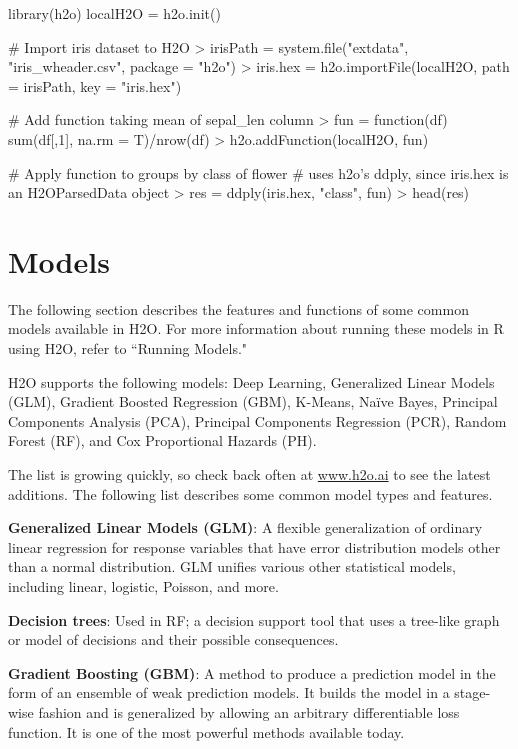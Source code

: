 \documentclass[11pt]{article}
\begin{document}
{\begin{spverbatim}
library(h2o)
localH2O = h2o.init()

# Import iris dataset to H2O
> irisPath = system.file("extdata", "iris_wheader.csv", package = "h2o")
> iris.hex = h2o.importFile(localH2O, path = irisPath, key = "iris.hex")

# Add function taking mean of sepal_len column
> fun = function(df) { sum(df[,1], na.rm = T)/nrow(df) }
> h2o.addFunction(localH2O, fun)

# Apply function to groups by class of flower
# uses h2o's ddply, since iris.hex is an H2OParsedData object
> res = ddply(iris.hex, "class", fun)
> head(res)
\end{spverbatim}

\section{Models}

The following section describes the features and functions of some common models available in H2O.  For more information about running these models in R using H2O, refer to ``Running Models." 

H2O supports the following models: Deep Learning, Generalized Linear Models (GLM), Gradient Boosted Regression (GBM), K-Means, Na\"{i}ve Bayes, Principal Components Analysis (PCA), Principal Components Regression (PCR), Random Forest (RF), and Cox Proportional Hazards (PH). 

The list is growing quickly, so check back often at \url{www.h2o.ai} to see the latest additions. The following list describes some common model types and features. 

{\textbf{Generalized Linear Models (GLM)}}: A flexible generalization of ordinary linear regression for response variables that have error distribution models other than a normal distribution. GLM unifies various other statistical models, including linear, logistic, Poisson, and more.

{\textbf{Decision trees}}: Used in RF; a decision support tool that uses a tree-like graph or model of decisions and their possible consequences.

{\textbf{Gradient Boosting (GBM)}}: A method to produce a prediction model in the form of an ensemble of weak prediction models. It builds the model in a stage-wise fashion and is generalized by allowing an arbitrary differentiable loss function. It is one of the most powerful methods available today.

}
\end{document}
